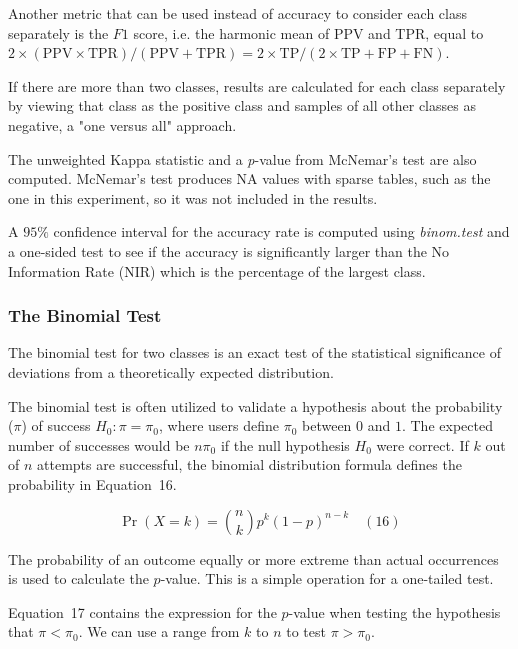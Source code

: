 \documentclass[sn-mathphys-num]{sn-jnl}%
\begin{document}
Another metric that can be used instead of accuracy to consider each class separately is the $F1$ score, i.e. the harmonic mean of PPV and TPR, equal to $2 \times (\mathrm{PPV} \times \mathrm{TPR}) / (\mathrm{PPV} + \mathrm{TPR}) = 2 \times \mathrm{TP} / (2 \times \mathrm{TP} + \mathrm{FP} + \mathrm{FN})$.

If there are more than two classes, results are calculated for each class separately by viewing that class as the positive class and samples of all other classes as negative, a "one versus all" approach.

The unweighted Kappa statistic and a \textit{p}-value from McNemar's test are also computed. McNemar's test produces NA values with sparse tables, such as the one in this experiment, so it was not included in the results.

A $95\%$ confidence interval for the accuracy rate is computed using \textit{binom.test} and a one-sided test \cite{binom.test2024, clopper1934use, conover1999practical, hollander2013nonparametric} to see if the accuracy is significantly larger than the No Information Rate (NIR) which is the percentage of the largest class.

\subsubsection{The Binomial Test}

The binomial test \cite{howell1992statistical, graphpadGraphPadPrism} for two classes is an exact test of the statistical significance of deviations from a theoretically expected distribution.

The binomial test is often utilized to validate a hypothesis about the probability ($\pi$) of success $H_{0}\colon \pi =\pi_{0}$, where users define $\pi_{0}$ between $0$ and $1$. The expected number of successes would be $n\pi_{0}$ if the null hypothesis $H_{0}$ were correct. If $k$ out of $n$ attempts are successful, the binomial distribution formula defines the probability in Equation~16.

\begin{equation}
	\Pr(X=k)={\binom{n}{k}}p^{k}(1-p)^{n-k}
	\quad\left(16\right)
\end{equation}

The probability of an outcome equally or more extreme than actual occurrences is used to calculate the $p$-value. This is a simple operation for a one-tailed test. 

Equation~17 contains the expression for the $p$-value when testing the hypothesis that $\pi <\pi_{0}$. We can use a range from $k$ to $n$ to test $\pi >\pi_{0}$.
\end{document}
